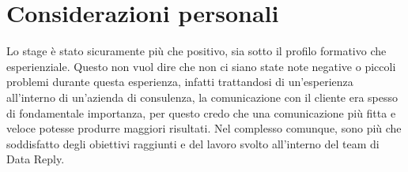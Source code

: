 \section{Considerazioni personali}
Lo stage è stato sicuramente più che positivo, sia sotto il profilo formativo che esperienziale. Questo non vuol dire che non ci siano state note negative o piccoli problemi durante questa esperienza, infatti trattandosi di un'esperienza all'interno di un'azienda di consulenza, la comunicazione con il cliente era spesso di fondamentale importanza, per questo credo che una comunicazione più fitta e veloce potesse produrre maggiori risultati. 
Nel complesso comunque, sono più che soddisfatto degli obiettivi raggiunti e del lavoro svolto all'interno del team di Data Reply.